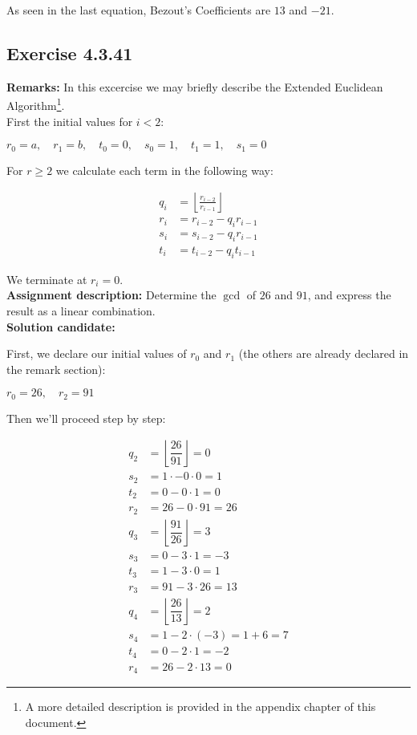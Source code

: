 \documentclass{report}
\newcommand{\cent}[1]{\begin{center}#1\end{center}}
\newcommand{\mAlign}[1]{\begin{align*}#1\end{align*}}
\newcommand{\assignmentDescription}{\textbf{Assignment description: }}
\newcommand{\myRemark}{\textbf{Remarks: }}
\newcommand{\solution}{\textbf{Solution candidate: }}
\newcommand{\Exercise}[1]{\subsection{Exercise #1}}
\newcommand{\defaultEnumerateLabel}{\textbf{\alph*.}}
\newcommand{\Floor}[1]{\left \lfloor{#1}\right \rfloor }
\begin{document}
\begin{enumerate}[label=\defaultEnumerateLabel]
\begin{enumerate}[label=\defaultEnumerateLabel]
		As seen in the last equation, Bezout's Coefficients are $13$ and $-21$.\\
	\end{enumerate}
	\Exercise{4.3.41}
	
	\myRemark
	In this excercise we may briefly describe the Extended Euclidean Algorithm\footnote{A more detailed description is provided in the appendix chapter of this document.}.\\
	
	First the initial values for $i < 2$: 
	
	\cent{$r_0 = a, \quad  r_1 = b, \quad  t_0 = 0, \quad  s_0 = 1, \quad  t_1 = 1, \quad  s_1 = 0$}
	
	For $r \geq 2$ we calculate each term in the following way:
	
	\mAlign{
		q_i &= \Floor{\frac{r_{i-2}}{r_{i-1}}} \\
		r_i &= r_{i-2} - q_i r_{i-1} \\
		s_i &= s_{i-2} - q_i r_{i-1} \\
		t_i &= t_{i-2} - q_i t_{i-1}
	}
	
	We terminate at $r_i = 0$.\\
	
	\assignmentDescription
	Determine the $\gcd$ of $26$ and $91$, and express the result as a linear combination.\\
	
	\solution
	
	First, we declare our initial values of $r_0$ and $r_1$ (the others are already declared in the remark section):
	
	\cent{$r_0 = 26, \quad r_2 = 91$}
	
	Then we'll proceed step by step:
	
	\mAlign{
		q_2 &= \Floor{\dfrac{26}{91}} = 0 \\
		s_2 &=  1 \cdot - 0 \cdot 0 = 1\\
		t_2 &= 0 - 0 \cdot 1 = 0\\
		r_2 &= 26 - 0 \cdot 91 = 26\\
		q_3 &= \Floor{\dfrac{91}{26}} = 3 \\
		s_3 &= 0 - 3 \cdot 1 = -3 \\
		t_3 &= 1 - 3 \cdot 0 = 1\\
		r_3 &= 91 - 3 \cdot 26 = 13 \\
		q_4 &= \Floor{\dfrac{26}{13}} = 2 \\
		s_4 &=  1 - 2 \cdot (-3) = 1 + 6 = 7 \\
		t_4 &= 0 - 2 \cdot 1 = -2 \\
		r_4 &= 26 - 2 \cdot 13 = 0
	}


\end{enumerate}
\end{document}
